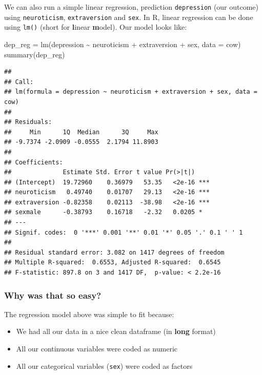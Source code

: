 \documentclass[
]{book}
\newenvironment{Shaded}{\begin{snugshade}}{\end{snugshade}}
\newcommand{\AttributeTok}[1]{\textcolor[rgb]{0.77,0.63,0.00}{#1}}
\newcommand{\FunctionTok}[1]{\textcolor[rgb]{0.00,0.00,0.00}{#1}}
\newcommand{\NormalTok}[1]{#1}
\newcommand{\OtherTok}[1]{\textcolor[rgb]{0.56,0.35,0.01}{#1}}
\newcommand{\SpecialCharTok}[1]{\textcolor[rgb]{0.00,0.00,0.00}{#1}}
\providecommand{\tightlist}{%
  \setlength{\itemsep}{0pt}\setlength{\parskip}{0pt}}
\begin{document}
We can also run a simple linear regression, prediction \texttt{depression}
(our outcome) using \texttt{neuroticism}, \texttt{extraversion} and \texttt{sex}. In R,
linear regression can be done using \texttt{lm()} (short for \textbf{l}inear
\textbf{m}odel). Our model looks like:

\begin{Shaded}
\begin{Highlighting}[]
\NormalTok{dep\_reg }\OtherTok{=} \FunctionTok{lm}\NormalTok{(depression }\SpecialCharTok{\textasciitilde{}}\NormalTok{ neuroticism }\SpecialCharTok{+}\NormalTok{ extraversion }\SpecialCharTok{+}\NormalTok{ sex,}
             \AttributeTok{data =}\NormalTok{ cow)}
\FunctionTok{summary}\NormalTok{(dep\_reg)}
\end{Highlighting}
\end{Shaded}

\begin{verbatim}
## 
## Call:
## lm(formula = depression ~ neuroticism + extraversion + sex, data = cow)
## 
## Residuals:
##     Min      1Q  Median      3Q     Max 
## -9.7374 -2.0909 -0.0555  2.1794 11.8903 
## 
## Coefficients:
##              Estimate Std. Error t value Pr(>|t|)    
## (Intercept)  19.72960    0.36979   53.35   <2e-16 ***
## neuroticism   0.49740    0.01707   29.13   <2e-16 ***
## extraversion -0.82358    0.02113  -38.98   <2e-16 ***
## sexmale      -0.38793    0.16718   -2.32   0.0205 *  
## ---
## Signif. codes:  0 '***' 0.001 '**' 0.01 '*' 0.05 '.' 0.1 ' ' 1
## 
## Residual standard error: 3.082 on 1417 degrees of freedom
## Multiple R-squared:  0.6553, Adjusted R-squared:  0.6545 
## F-statistic: 897.8 on 3 and 1417 DF,  p-value: < 2.2e-16
\end{verbatim}

\hypertarget{why-was-that-so-easy}{%
\subsubsection{Why was that so easy?}\label{why-was-that-so-easy}}

The regression model above was simple to fit because:

\begin{itemize}
\tightlist
\item
  We had all our data in a nice clean dataframe (in \textbf{long} format)
\item
  All our continuous variables were coded as numeric
\item
  All our categorical variables (\texttt{sex}) were coded as factors
\end{itemize}
\end{document}
